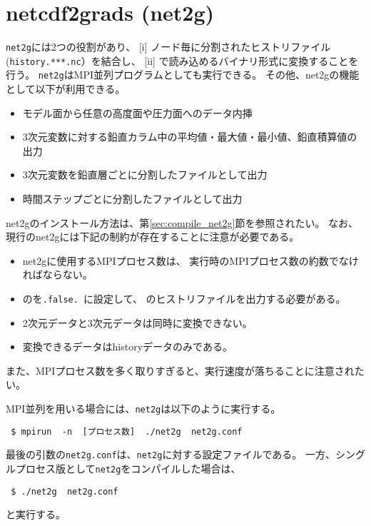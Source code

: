 \section{netcdf2grads (net2g)} \label{sec:net2g}

\verb|net2g|には2つの役割があり、
[i] ノード毎に分割されたヒストリファイル(\verb|history.***.nc|）を結合し、
[ii] {\grads}で読み込めるバイナリ形式に変換することを行う。
\verb|net2g|はMPI並列プログラムとしても実行できる。
その他、net2gの機能として以下が利用できる。
%
\begin{itemize}
 \item モデル面から任意の高度面や圧力面へのデータ内挿
 \item 3次元変数に対する鉛直カラム中の平均値・最大値・最小値、鉛直積算値の出力
 \item 3次元変数を鉛直層ごとに分割したファイルとして出力
 \item 時間ステップごとに分割したファイルとして出力
\end{itemize}

net2gのインストール方法は、第\ref{sec:compile_net2g}節を参照されたい。
なお、現行のnet2gには下記の制約が存在することに注意が必要である。
\begin{itemize}
 \item net2gに使用するMPIプロセス数は、
\scalerm 実行時のMPIプロセス数の約数でなければならない。
\item {}のを\verb|.false. |に設定して、
\scalerm のヒストリファイルを出力する必要がある。
 \item 2次元データと3次元データは同時に変換できない。
 \item 変換できるデータはhistoryデータのみである。
\end{itemize}
また、MPIプロセス数を多く取りすぎると、実行速度が落ちることに注意されたい。


MPI並列を用いる場合には、\verb|net2g|は以下のように実行する。
\begin{verbatim}
 $ mpirun  -n  [プロセス数]  ./net2g  net2g.conf
\end{verbatim}
最後の引数の\verb|net2g.conf|は、\verb|net2g|に対する設定ファイルである。
一方、シングルプロセス版として\verb|net2g|をコンパイルした場合は、
\begin{verbatim}
 $ ./net2g  net2g.conf
\end{verbatim}
と実行する。

